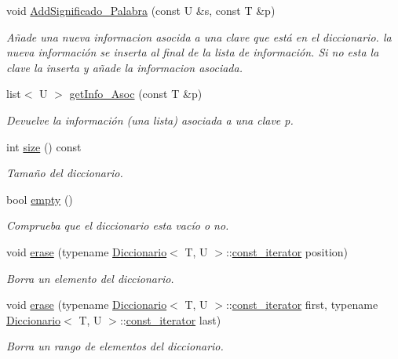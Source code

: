 \begin{DoxyCompactItemize}
void \hyperlink{classDiccionario_a7e167da231bff610001df3c20cc9b7a7}{Add\+Significado\+\_\+\+Palabra} (const U \&s, const T \&p)
\begin{DoxyCompactList}\small\item\em Añade una nueva informacion asocida a una clave que está en el diccionario. la nueva información se inserta al final de la lista de información. Si no esta la clave la inserta y añade la informacion asociada. \end{DoxyCompactList}\item 
list$<$ U $>$ \hyperlink{classDiccionario_a292817b0fda893a41cd9313b4c65cc61}{get\+Info\+\_\+\+Asoc} (const T \&p)
\begin{DoxyCompactList}\small\item\em Devuelve la información (una lista) asociada a una clave p. \end{DoxyCompactList}\item 
int \hyperlink{classDiccionario_aa576b001759429fd58210ca57257d6f8}{size} () const
\begin{DoxyCompactList}\small\item\em Tamaño del diccionario. \end{DoxyCompactList}\item 
bool \hyperlink{classDiccionario_ae7215bf0462b43065fef6baadd484c5b}{empty} ()
\begin{DoxyCompactList}\small\item\em Comprueba que el diccionario esta vacío o no. \end{DoxyCompactList}\item 
void \hyperlink{classDiccionario_aa608225f0f34fabbb6955eb834f13b89}{erase} (typename \hyperlink{classDiccionario}{Diccionario}$<$ T, U $>$\+::\hyperlink{classDiccionario_1_1const__iterator}{const\+\_\+iterator} position)
\begin{DoxyCompactList}\small\item\em Borra un elemento del diccionario. \end{DoxyCompactList}\item 
void \hyperlink{classDiccionario_ae404124f4fa5c5d08e06944692f40397}{erase} (typename \hyperlink{classDiccionario}{Diccionario}$<$ T, U $>$\+::\hyperlink{classDiccionario_1_1const__iterator}{const\+\_\+iterator} first, typename \hyperlink{classDiccionario}{Diccionario}$<$ T, U $>$\+::\hyperlink{classDiccionario_1_1const__iterator}{const\+\_\+iterator} last)
\begin{DoxyCompactList}\small\item\em Borra un rango de elementos del diccionario. \end{DoxyCompactList}\item 

\end{DoxyCompactItemize}
